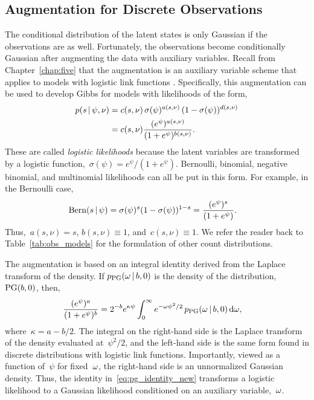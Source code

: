 \subsection{\polyagamma Augmentation for Discrete Observations}
The conditional distribution of the latent states is only Gaussian if
the observations are as well. Fortunately, the observations become
conditionally Gaussian after augmenting the data with \polyagamma
auxiliary variables.  Recall from Chapter~\ref{chap:five} that the
\polyagamma augmentation is an auxiliary variable scheme that applies
to models with logistic link functions \citep{polson2013bayesian}.
Specifically, this augmentation can be used to develop Gibbs for
models with likelihoods of the form,
\begin{align*}
  \nonumber  p(s \,|\, \psi, \nu)
  &= c(s, \nu) \, \sigma(\psi)^{a(s, \nu)} \,
  (1-\sigma(\psi))^{d(s, \nu)} \\
  &= c(s, \nu)
  \frac{(e^{\psi})^{a(s, \nu)}}
       {(1+e^{\psi})^{b(s, \nu)}}.
\end{align*}
These are called \emph{logistic likelihoods} because the latent
variables are transformed by a logistic
function,~${\sigma(\psi)=e^\psi /(1+e^\psi)}$.  Bernoulli, binomial,
negative binomial, and multinomial likelihoods can all be put in this
form.  For example, in the Bernoulli
case,
\begin{align*}
  \mathrm{Bern}(s \,|\, \psi) 
  &= \sigma(\psi)^{s}
    (1-\sigma(\psi))^{1-s}
  = \frac{(e^{\psi})^{s}}
       {(1+e^{\psi})}.
\end{align*}
Thus,~${a(s, \nu) = s}$,
${b(s,\nu) \equiv 1}$, and~${c(s, \nu) \equiv 1}$.
We refer the reader back to Table~\ref{tab:obs_models} for the formulation of
other count distributions.

The augmentation is based on an integral identity
derived from the Laplace transform of the \polyagamma density.
If $p_{\mathrm{PG}}({\omega}\,|\, b, 0)$ is the
density of the \polyagamma distribution,~${\mathrm{PG}(b, 0)}$,
then,
\begin{align}
  \frac{(e^{\psi})^a}{(1+e^{\psi})^b}
  &= 2^{-b} e^{\kappa \psi}
  \int_{0}^{\infty} e^{-{\omega} \psi^2 /2} \,
  p_{\mathrm{PG}}({\omega} \,|\, b, 0) \, \mathrm{d}{\omega},
\label{eq:pg_identity_new}
\end{align}
where~${\kappa=a-b/2}$. The integral on the right-hand side is the
Laplace transform of the \polyagamma density evaluated at~$\psi^2/2$,
and the left-hand side is the same form found in discrete
distributions with logistic link functions.  Importantly, viewed as a
function of~$\psi$ for fixed~${\omega}$, the right-hand side is an
unnormalized Gaussian density.  Thus, the identity
in~\eqref{eq:pg_identity_new} transforms a logistic likelihood to a
Gaussian likelihood conditioned on an auxiliary variable,~${\omega}$.

